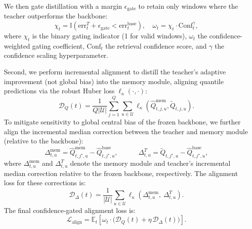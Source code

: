 We then gate distillation with a margin $\epsilon_{\text{gate}}$ to retain only windows where the teacher outperforms the backbone:
\begin{equation}
\chi_t=\mathbb{I}\!\left(\mathrm{err}^{T}_t+\epsilon_{\text{gate}}<\mathrm{err}^{\text{base}}_t\right),\quad
\omega_t=\chi_t\cdot \mathrm{Conf}_t^{\gamma},
\label{eq:tsm-gate}
\end{equation}
where $\chi_t$ is the binary gating indicator (1 for valid windows), $\omega_t$ the confidence-weighted gating coefficient, $\mathrm{Conf}_t$ the retrieval confidence score, and $\gamma$ the confidence scaling hyperparameter. 



Second, we perform incremental alignment to distill the teacher's adaptive improvement (not global bias) into the memory module, aligning quantile predictions via the robust Huber loss $\ell_{\kappa}(\cdot,\cdot)$:
\begin{equation}
\mathcal{D}_{Q}(t) = \frac{1}{Q|\mathcal{U}|}\sum_{j=1}^{Q}\sum_{u\in\mathcal{U}}\ell_{\kappa}\!\left(\widehat{Q}^{\text{mem}}_{t,j,u},\widetilde{Q}_{t,j,u}\right).
\label{eq:tsm-dq}
\end{equation}
To mitigate sensitivity to global central bias of the frozen backbone, we further align the incremental median correction between the teacher and memory module (relative to the backbone):
\begin{equation}
\Delta^{\text{mem}}_{t,u}=\widehat{Q}^{\text{mem}}_{t,j^\star,u}-\widehat{Q}^{\text{base}}_{t,j^\star,u}, \quad
\qquad
\Delta^{T}_{t,u}=\widetilde{Q}_{t,j^\star,u}-\widehat{Q}^{\text{base}}_{t,j^\star,u},
\label{eq:tsm-delta}
\end{equation}
where $\Delta^{\text{mem}}_{t,u}$ and $\Delta^{T}_{t,u}$ denote the memory module and teacher's incremental median correction relative to the frozen backbone, respectively. The alignment loss for these corrections is:
\begin{equation}
\mathcal{D}_{\Delta}(t) = \frac{1}{|\mathcal{U}|}\sum_{u\in\mathcal{U}}
\ell_{\kappa}\!\left(\Delta^{\text{mem}}_{t,u},~\Delta^{T}_{t,u}\right).
\label{eq:tsm-ddelta}
\end{equation}
The final confidence-gated alignment loss is:
\begin{equation}
\mathcal{L}_{\text{align}}=\mathbb{E}_{t}\!\left[\omega_t\cdot\bigl(\mathcal{D}_{Q}(t)+\eta\,\mathcal{D}_{\Delta}(t)\bigr)\right].
\label{eq:tsm-loss-align}
\end{equation}




